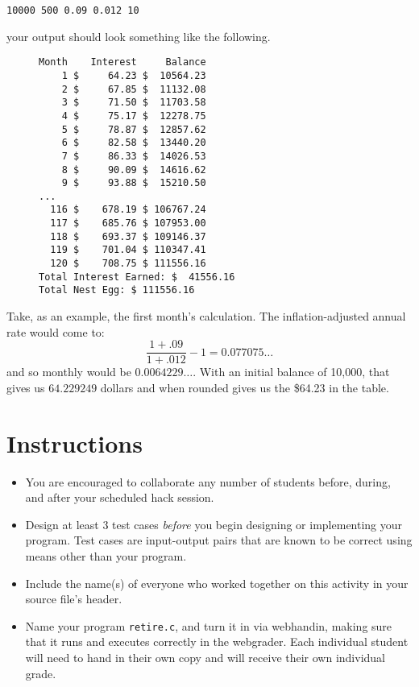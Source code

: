\documentclass[12pt]{scrartcl}
\begin{document}
\texttt{10000 500 0.09 0.012 10} 

your output should look something like the following.

\begin{figure}[H]
\begin{verbatim}
Month    Interest     Balance 
    1 $     64.23 $  10564.23
    2 $     67.85 $  11132.08
    3 $     71.50 $  11703.58
    4 $     75.17 $  12278.75
    5 $     78.87 $  12857.62
    6 $     82.58 $  13440.20
    7 $     86.33 $  14026.53
    8 $     90.09 $  14616.62
    9 $     93.88 $  15210.50
...    
  116 $    678.19 $ 106767.24
  117 $    685.76 $ 107953.00
  118 $    693.37 $ 109146.37
  119 $    701.04 $ 110347.41
  120 $    708.75 $ 111556.16
Total Interest Earned: $  41556.16
Total Nest Egg: $ 111556.16
\end{verbatim}
\end{figure}

Take, as an example, the first month's calculation.  The 
inflation-adjusted annual rate would come to:
  $$\frac{1 + .09}{1+.012} - 1 = 0.077075\ldots$$
and so monthly would be $0.0064229\ldots$.  With an initial
balance of 10,000, that gives us $64.229249$ dollars and when
rounded gives us the \$64.23 in the table.


\section*{Instructions}

\begin{itemize}
  \item You are encouraged to collaborate any number of students 
  before, during, and after your scheduled hack session.  
  \item Design at least 3 test cases \emph{before} you begin
  designing or implementing your program.  Test cases are 
  input-output pairs that are known to be correct using means
  other than your program.
  \item Include the name(s) of everyone who worked together on
  this activity in your source file's header.
  \item Name your program \texttt{retire.c}, and
  turn it in via webhandin, making sure that it runs and executes
  correctly in the webgrader.  Each individual student will need
  to hand in their own copy and will receive their own individual
  grade.
\end{itemize}
  
\end{document}
